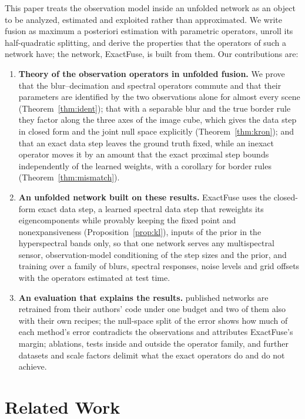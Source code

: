 \documentclass[journal]{IEEEtran}
\begin{document}
This paper treats the observation model inside an unfolded network as an object to be analyzed, estimated and exploited rather than approximated. We write fusion as maximum a posteriori estimation with parametric operators, unroll its half-quadratic splitting, and derive the properties that the operators of such a network have; the network, ExactFuse, is built from them. Our contributions are:
\begin{enumerate}
\item \textbf{Theory of the observation operators in unfolded fusion.} We prove that the blur--decimation and spectral operators commute and that their parameters are identified by the two observations alone for almost every scene (Theorem~\ref{thm:ident}); that with a separable blur and the true border rule they factor along the three axes of the image cube, which gives the data step in closed form and the joint null space explicitly (Theorem~\ref{thm:kron}); and that an exact data step leaves the ground truth fixed, while an inexact operator moves it by an amount that the exact proximal step bounds independently of the learned weights, with a corollary for border rules (Theorem~\ref{thm:mismatch}).
\item \textbf{An unfolded network built on these results.} ExactFuse uses the closed-form exact data step, a learned spectral data step that reweights its eigencomponents while provably keeping the fixed point and nonexpansiveness (Proposition~\ref{prop:kl}), inputs of the prior in the hyperspectral bands only, so that one network serves any multispectral sensor, observation-model conditioning of the step sizes and the prior, and training over a family of blurs, spectral responses, noise levels and grid offsets with the operators estimated at test time.
\item \textbf{An evaluation that explains the results.}  published networks are retrained from their authors' code under one budget and two of them also with their own recipes; the null-space split of the error shows how much of each method's error contradicts the observations and attributes ExactFuse's margin; ablations, tests inside and outside the operator family, and further datasets and scale factors delimit what the exact operators do and do not achieve.
\end{enumerate}

\section{Related Work}
\end{document}
